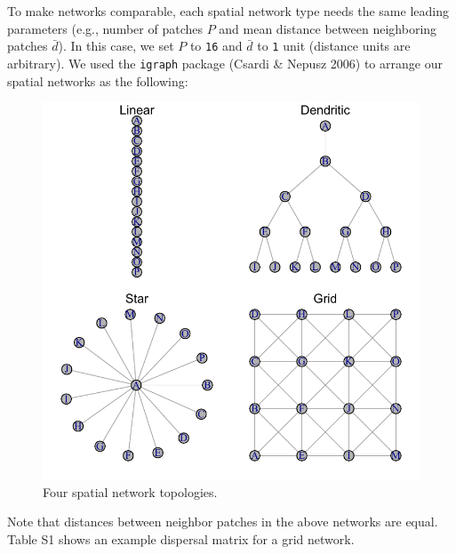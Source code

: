 \documentclass[
]{article}
\begin{document}
To make networks comparable, each spatial network type needs the same
leading parameters (e.g., number of patches \(P\) and mean distance
between neighboring patches \(\bar{d}\)). In this case, we set \(P\) to
\texttt{16} and \(\bar{d}\) to \texttt{1} unit (distance units are
arbitrary). We used the \texttt{igraph} package (Csardi \& Nepusz 2006)
to arrange our spatial networks as the following:

\begin{figure}[H]

{\centering \includegraphics{Managing_for_ecological_surprises_in_metapopulations_files/figure-latex/networks-1} 

}

\caption{Four spatial network topologies.}\label{fig:networks}
\end{figure}

Note that distances between neighbor patches in the above networks are
equal. Table S1 shows an example dispersal matrix for a grid network.
\end{document}
